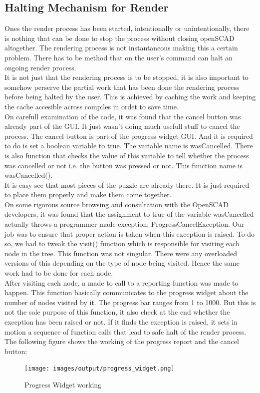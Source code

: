 \subsection{Halting Mechanism for Render}
Ones the render process has been started, intentionally or unintentionally, there is nothing that can be done to stop the process without closing openSCAD altogether. The rendering process is not instantaneous making this a certain problem. There has to be method that on the user's command can halt an ongoing render process.\\
It is not just that the rendering process is to be stopped, it is also important to somehow perserve the partial work that has been done the rendering process before being halted by the user. This is achieved by caching the work and keeping the cache accesible across compiles in ordet to save time.\\
On carefull examination of the code, it was found that the cancel button was already part of the GUI. It just wasn't doing much usefull stuff to cancel the process. The cancel button is part of the progress widget GUI. And it is required to do is set a boolean variable to true. The variable name is wasCancelled. There is also function that checks the value of this variable to tell whether the process was cancelled or not i.e. the button was pressed or not. This function name is wasCancelled().\\
It is easy see that most pieces of the puzzle are already there. It is just required to place them properly and make them come together.\\
On some rigorous source browsing and consultation with the OpenSCAD developers, it was found that the assignment to true of the variable wasCancelled actually throws a programmer made exception: ProgressCancelException. Our job was to ensure that proper action is taken when this exception is raised. To do so, we had to tweak the visit() function which is responsible for visiting each node in the tree. This function was not singular. There were any overloaded versions of this depending on the type of node being visited. Hence the same work had to be done for each node.\\
After visiting each node, a made to call to a reporting function was made to happen. This function basically communicates to the progress widget about the number of nodes visited by it. The progress bar ranges from 1 to 1000. But this is not the sole purpose of this function, it also check at the end whether the exception has been raised or not. If it finds the exception is raised, it sets in motion a sequence of function calls that lead to safe halt of the render process. The following figure shows the working of the progress report and the cancel button:
\begin{figure}
	\centering
	\texttt{[image: images/output/progress\_widget.png]}
	\caption{Progress Widget working}
\end{figure}
